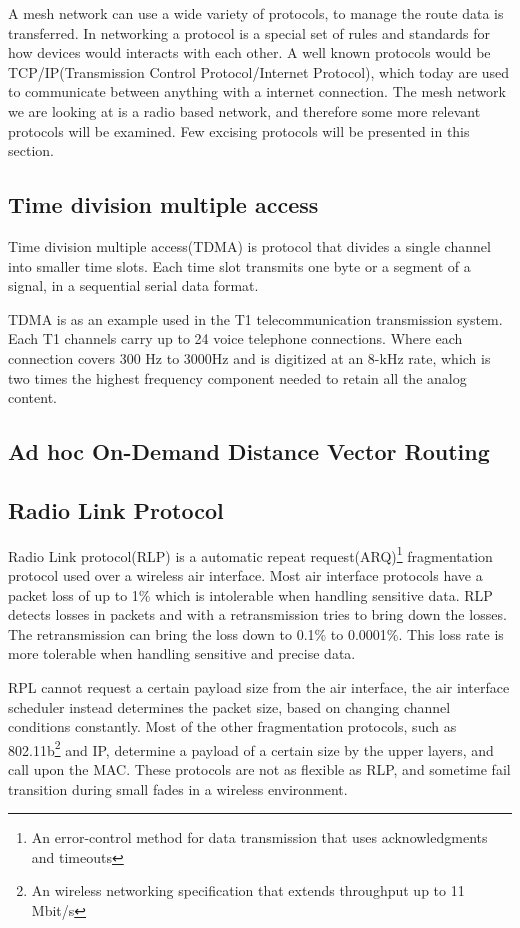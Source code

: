 A mesh network can use a wide variety of protocols, to manage the route data is transferred.
In networking a protocol is a special set of rules and standards for how devices would interacts with each other.
A well known protocols would be TCP/IP(Transmission Control Protocol/Internet Protocol), which today are used to communicate between anything with a internet connection.
The mesh network we are looking at is a radio based network, and therefore some more relevant protocols will be examined. 
Few excising protocols will be presented in this section.

\subsection{Time division multiple access}
Time division multiple access(TDMA) is protocol that divides a single channel into smaller time slots. Each time slot transmits one byte or a segment of a signal, in a sequential serial data format.

TDMA is as an example used in the T1 telecommunication transmission system.
Each T1 channels carry up to 24 voice telephone connections.
Where each connection covers 300 Hz to 3000Hz and is digitized at an 8-kHz rate, which is two times the highest frequency component needed to retain all the analog content.
\begin{figure}[!h]
	\centering
\end{figure}


\subsection{Ad hoc On-Demand Distance Vector Routing}


\subsection{Radio Link Protocol}
Radio Link protocol(RLP) is a automatic repeat request(ARQ)\footnote{An error-control method for data transmission that uses acknowledgments and timeouts} fragmentation protocol used over a wireless air interface.
Most air interface protocols have a packet loss of up to 1\% which is intolerable when handling sensitive data.
RLP detects losses in packets and with a retransmission tries to bring down the losses.
The retransmission can bring the loss down to 0.1\% to 0.0001\%.
This loss rate is more tolerable when handling sensitive and precise data.

RPL cannot request a certain payload size from the air interface, the air interface scheduler instead determines the packet size, based on changing channel conditions constantly.
Most of the other fragmentation protocols, such as 802.11b\footnote{An wireless networking specification that extends throughput up to 11 Mbit/s} and IP, determine a payload of a certain size by the upper layers, and call upon the MAC.
These protocols are not as flexible as RLP, and sometime fail transition during small fades in a wireless environment. 